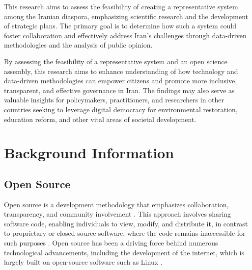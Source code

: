 \documentclass{IEEEtran}
\begin{document}
This research aims to assess the feasibility of creating a representative system among the Iranian diaspora, emphasizing scientific research and the development of strategic plans. The primary goal is to determine how such a system could foster collaboration and effectively address Iran's challenges through data-driven methodologies and the analysis of public opinion.


By assessing the feasibility of a representative system and an open science assembly, this research aims to enhance understanding of how technology and data-driven methodologies can empower citizens and promote more inclusive, transparent, and effective governance in Iran. The findings may also serve as valuable insights for policymakers, practitioners, and researchers in other countries seeking to leverage digital democracy for environmental restoration, education reform, and other vital areas of societal development.

\section{Background Information}

\subsection{Open Source}
Open source is a development methodology that emphasizes collaboration, transparency, and community involvement \cite{dibona1999opensource}. This approach involves sharing software code, enabling individuals to view, modify, and distribute it, in contrast to proprietary or closed-source software, where the code remains inaccessible for such purposes \cite{dibona1999opensource}. Open source has been a driving force behind numerous technological advancements, including the development of the internet, which is largely built on open-source software such as Linux \cite{dibona1999opensource}.
\end{document}
